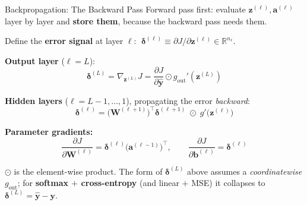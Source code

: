 \documentclass[aspectratio=169,11pt]{beamer}
\newcommand{\emphc}[1]{\textcolor{harvardcrimson}{#1}}
\newcommand{\bb}{\bm{b}}
\newcommand{\z}{\bm{z}}
\newcommand{\W}{\bm{W}}
\renewcommand{\a}{\bm{a}}
\newcommand{\R}{\mathbb{R}}
\begin{document}
\begin{frame}{Backpropagation: The Backward Pass}
{\footnotesize \emphc{Forward pass first:} evaluate $\z^{(\ell)}, \a^{(\ell)}$ layer by layer and \textbf{store them}, because the backward pass needs them.}

\vspace{0.1cm}
Define the \textbf{error signal} at layer $\ell$: $\;\bm{\delta}^{(\ell)} \equiv \partial J/\partial \z^{(\ell)} \in \R^{n_\ell}$.

\textbf{Output layer} ($\ell = L$):
\[
    \bm{\delta}^{(L)} = \nabla_{\!\z^{(L)}} J = \frac{\partial J}{\partial \hat{\bm{y}}}\odot g_{\text{out}}'(\z^{(L)})
\]

\textbf{Hidden layers} ($\ell = L{-}1, \dots, 1$), propagating the error \textit{backward}:
\[
    \boxed{\bm{\delta}^{(\ell)} = \big(\W^{(\ell+1)}\big)^{\!\top}\bm{\delta}^{(\ell+1)} \;\odot\; g'\!\big(\z^{(\ell)}\big)}
\]

\textbf{Parameter gradients:}
\vspace{-0.15cm}
\[
    \frac{\partial J}{\partial \W^{(\ell)}} = \bm{\delta}^{(\ell)}\big(\a^{(\ell-1)}\big)^{\!\top}, \qquad
    \frac{\partial J}{\partial \bb^{(\ell)}} = \bm{\delta}^{(\ell)}
\]
\vspace{-0.5cm}


{\footnotesize $\odot$ is the element-wise product.  The form of $\bm{\delta}^{(L)}$ above assumes a \emph{coordinatewise} $g_{\text{out}}$; for \textbf{softmax $+$ cross-entropy} (and linear $+$ MSE) it collapses to $\bm{\delta}^{(L)} = \hat{\bm{y}} - \bm{y}$.}
\end{frame}
\end{document}
